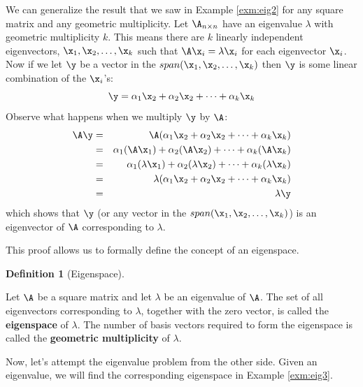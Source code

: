 \documentclass[
]{article}
\theoremstyle{definition}
\newtheorem{definition}{Definition}[section]
\theoremstyle{definition}
\theoremstyle{definition}
\theoremstyle{definition}
\theoremstyle{remark}
\begin{document}
We can generalize the result that we saw in Example \ref{exm:eig2} for any square matrix and any geometric multiplicity. Let \(\A_{n\times n}\) have an eigenvalue \(\lambda\) with geometric multiplicity \(k\). This means there are \(k\) linearly independent eigenvectors, \(\x_1,\x_2,\dots,\x_k\) such that \(\A\x_i=\lambda\x_i\) for each eigenvector \(\x_i\). Now if we let \(\y\) be a vector in the \(span(\x_1,\x_2,\dots,\x_k)\) then \(\y\) is some linear combination of the \(\x_i\)'s:
\[\y=\alpha_1\x_2+\alpha_2\x_2+\dots+\alpha_k\x_k\]
Observe what happens when we multiply \(\y\) by \(\A\):
\begin{eqnarray*}
\A\y &=&\A(\alpha_1\x_2+\alpha_2\x_2+\dots+\alpha_k\x_k) \\  
&=& \alpha_1(\A\x_1)+\alpha_2(\A\x_2)+\dots +\alpha_k(\A\x_k) \\ 
&=& \alpha_1(\lambda\x_1)+\alpha_2(\lambda\x_2)+\dots +\alpha_k(\lambda\x_k) \\ 
&=& \lambda(\alpha_1\x_2+\alpha_2\x_2+\dots+\alpha_k\x_k) \\
&=& \lambda\y
\end{eqnarray*}
which shows that \(\y\) (or any vector in the \(span(\x_1,\x_2,\dots,\x_k)\)) is an eigenvector of \(\A\) corresponding to \(\lambda\).

This proof allows us to formally define the concept of an eigenspace.

\begin{definition}[Eigenspace]
\protect\hypertarget{def:eigenspace}{}\label{def:eigenspace}

Let \(\A\) be a square matrix and let \(\lambda\) be an eigenvalue of \(\A\). The set of all eigenvectors corresponding to \(\lambda\), together with the zero vector, is called the \textbf{eigenspace} of \(\lambda\). The number of basis vectors required to form the eigenspace is called the \textbf{geometric multiplicity} of \(\lambda\).

\end{definition}

Now, let's attempt the eigenvalue problem from the other side. Given an eigenvalue, we will find the corresponding eigenspace in Example \ref{exm:eig3}.
\end{document}
